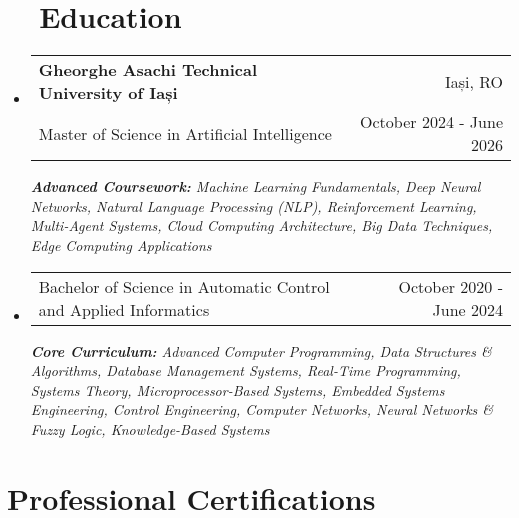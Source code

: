 \documentclass[a4paper,11pt]{article}
\makeatletter
\newcommand{\oracleDataScienceLink}{https://catalog-education.oracle.com/pls/certview/sharebadge?id=your-badge-id}
\newcommand{\oracleVectorSearchLink}{https://catalog-education.oracle.com/pls/certview/sharebadge?id=your-badge-id}
\newcommand{\oracleGenAILink}{https://catalog-education.oracle.com/pls/certview/sharebadge?id=36F42AE9CD423CBEDFC5C81160E753619C6EC388D2CA3FB3FDBB2700CD1BE2AB}
\newcommand{\oracleAIFoundationsLink}{https://catalog-education.oracle.com/pls/certview/sharebadge?id=615C9F04543C7A32303E280E44615A75F07207864CD9E6FA301C63CE57A7FDD9}
\newcommand{\resumeSubheading}[4]{
  \vspace{-1pt}\item
    \begin{tabular*}{0.97\textwidth}{l@{\extracolsep{\fill}}r}
      \color{NavyBlue}\textbf{#1} & #2 \\
      #3 & #4 \\
    \end{tabular*}\vspace{-5pt}
}
\newcommand{\resumeSubheadingSimple}[2]{
  \vspace{-1pt}\item
    \begin{tabular*}{0.97\textwidth}{l@{\extracolsep{\fill}}r}
      #1 & #2 \\
    \end{tabular*}\vspace{-5pt}
}
\newcommand{\resumeSubHeadingListStart}{\begin{itemize}[leftmargin=*, label={}]}
\newcommand{\resumeSubHeadingListEnd}{\end{itemize}}
\makeatother
\begin{document}
\vspace{-5pt}
\section{~~Education}
\resumeSubHeadingListStart
  \resumeSubheading
    {Gheorghe Asachi Technical University of Iași}{Iași, RO}
    {Master of Science in Artificial Intelligence}{October 2024 - June 2026}
      {\par\footnotesize \textit{\textbf{Advanced Coursework:} Machine Learning Fundamentals, Deep Neural Networks, Natural Language Processing (NLP), Reinforcement Learning, Multi-Agent Systems, Cloud Computing Architecture, Big Data Techniques, Edge Computing Applications}}
  \vspace{-5pt}
      \resumeSubheadingSimple
    {Bachelor of Science in Automatic Control and Applied Informatics}{October 2020 - June 2024}
     {\par\footnotesize  \textit{\textbf{Core Curriculum:} Advanced Computer Programming, Data Structures \& Algorithms, Database Management Systems, Real-Time Programming, Systems Theory, Microprocessor-Based Systems, Embedded Systems Engineering, Control Engineering, Computer Networks, Neural Networks \& Fuzzy Logic, Knowledge-Based Systems}}
  \resumeSubHeadingListEnd    

\section{Professional Certifications}
\end{document}
